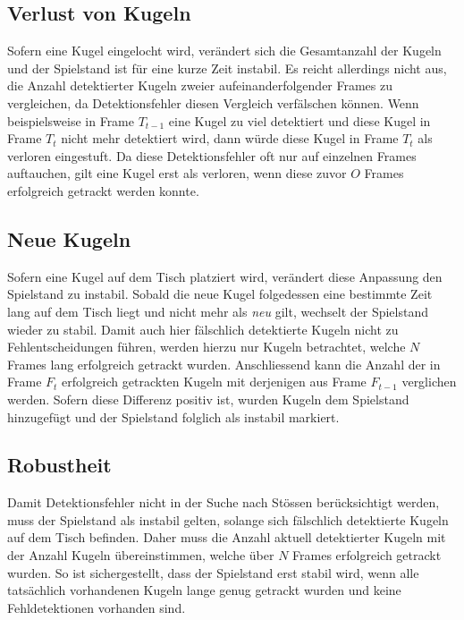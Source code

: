\subsection{Verlust von Kugeln}
Sofern eine Kugel eingelocht wird, verändert sich die Gesamtanzahl der Kugeln und der Spielstand ist für eine kurze Zeit instabil.
Es reicht allerdings nicht aus, die Anzahl detektierter Kugeln zweier aufeinanderfolgender Frames zu vergleichen,
da Detektionsfehler diesen Vergleich verfälschen können.
Wenn beispielsweise in Frame $T_{t-1}$ eine Kugel zu viel detektiert und diese Kugel in Frame $T_{t}$ nicht mehr
detektiert wird, dann würde diese Kugel in Frame $T_{t}$ als verloren eingestuft.
Da diese Detektionsfehler oft nur auf einzelnen Frames auftauchen, gilt eine Kugel erst als verloren, wenn diese zuvor
$O$ Frames erfolgreich getrackt werden konnte.

\subsection{Neue Kugeln}
Sofern eine Kugel auf dem Tisch platziert wird, verändert diese Anpassung den Spielstand zu instabil.
Sobald die neue Kugel folgedessen eine bestimmte Zeit lang auf dem Tisch liegt und nicht mehr als \emph{neu} gilt,
wechselt der Spielstand wieder zu stabil.
Damit auch hier fälschlich detektierte Kugeln nicht zu Fehlentscheidungen führen, werden hierzu nur Kugeln
betrachtet, welche $N$ Frames lang erfolgreich getrackt wurden.
Anschliessend kann die Anzahl der in Frame $F_{t}$ erfolgreich getrackten Kugeln mit derjenigen aus Frame $F_{t-1}$
verglichen werden.
Sofern diese Differenz positiv ist, wurden Kugeln dem Spielstand hinzugefügt und der Spielstand folglich als instabil markiert.

\subsection{Robustheit}
Damit Detektionsfehler nicht in der Suche nach Stössen berücksichtigt werden, muss der Spielstand als instabil gelten,
solange sich fälschlich detektierte Kugeln auf dem Tisch befinden.
Daher muss die Anzahl aktuell detektierter Kugeln mit der Anzahl Kugeln übereinstimmen, welche über $N$ Frames erfolgreich
getrackt wurden.
So ist sichergestellt, dass der Spielstand erst stabil wird, wenn alle tatsächlich vorhandenen Kugeln lange genug
getrackt wurden und keine Fehldetektionen vorhanden sind.

